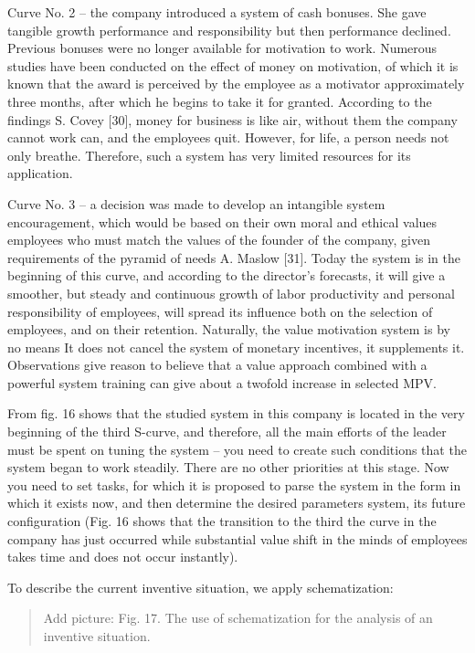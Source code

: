 \documentclass[11pt,a4paper]{book}
\newcommand{\addpicture}[1]{
  \begin{quote} Add picture: #1\end{quote}
}
\begin{document}
Curve No. 2 -- the company introduced a system of cash bonuses. She gave
tangible growth performance and responsibility but then performance declined.
Previous bonuses were no longer available for motivation to work. Numerous
studies have been conducted on the effect of money on motivation, of which it
is known that the award is perceived by the employee as a motivator
approximately three months, after which he begins to take it for granted.
According to the findings S. Covey [30], money for business is like air,
without them the company cannot work can, and the employees quit. However, for
life, a person needs not only breathe. Therefore, such a system has very
limited resources for its application.

Curve No. 3 -- a decision was made to develop an intangible system
encouragement, which would be based on their own moral and ethical values
employees who must match the values of the founder of the company, given
requirements of the pyramid of needs A. Maslow [31]. Today the system is in
the beginning of this curve, and according to the director’s forecasts, it
will give a smoother, but steady and continuous growth of labor productivity
and personal responsibility of employees, will spread its influence both on
the selection of employees, and on their retention. Naturally, the value
motivation system is by no means It does not cancel the system of monetary
incentives, it supplements it. Observations give reason to believe that a
value approach combined with a powerful system training can give about a
twofold increase in selected MPV.

From fig. 16 shows that the studied system in this company is located in the
very beginning of the third S-curve, and therefore, all the main efforts of
the leader must be spent on tuning the system -- you need to create such
conditions that the system began to work steadily. There are no other
priorities at this stage.  Now you need to set tasks, for which it is proposed
to parse the system in the form in which it exists now, and then determine the
desired parameters system, its future configuration (Fig. 16 shows that the
transition to the third the curve in the company has just occurred while
substantial value shift in the minds of employees takes time and does not
occur instantly).

To describe the current inventive situation, we apply schematization:

\addpicture{Fig. 17. The use of schematization for the analysis of an
  inventive situation.}
\end{document}
